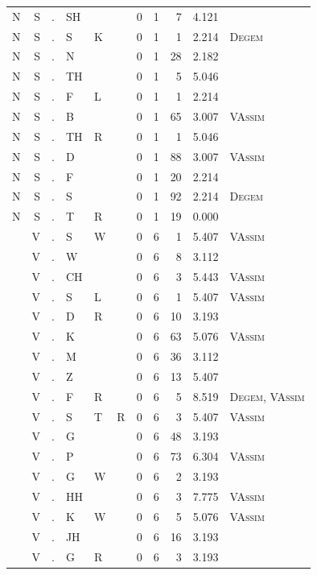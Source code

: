 \documentclass[12pt]{article}
\begin{document}
\begin{longtable}{r@{ } r@{ } c@{ } l@{ } l@{ } l@{ } r r r r l }
N & S & . & SH &  &  & 0 & 1 & 7 & 4.121 &  \\
N & S & . & S & K &  & 0 & 1 & 1 & 2.214 & \textsc{Degem} \\
N & S & . & N &  &  & 0 & 1 & 28 & 2.182 &  \\
N & S & . & TH &  &  & 0 & 1 & 5 & 5.046 &  \\
N & S & . & F & L &  & 0 & 1 & 1 & 2.214 &  \\
N & S & . & B &  &  & 0 & 1 & 65 & 3.007 & \textsc{VAssim} \\
N & S & . & TH & R &  & 0 & 1 & 1 & 5.046 &  \\
N & S & . & D &  &  & 0 & 1 & 88 & 3.007 & \textsc{VAssim} \\
N & S & . & F &  &  & 0 & 1 & 20 & 2.214 &  \\
N & S & . & S &  &  & 0 & 1 & 92 & 2.214 & \textsc{Degem} \\
N & S & . & T & R &  & 0 & 1 & 19 & 0.000 &  \\
 & V & . & S & W &  & 0 & 6 & 1 & 5.407 & \textsc{VAssim} \\
 & V & . & W &  &  & 0 & 6 & 8 & 3.112 &  \\
 & V & . & CH &  &  & 0 & 6 & 3 & 5.443 & \textsc{VAssim} \\
 & V & . & S & L &  & 0 & 6 & 1 & 5.407 & \textsc{VAssim} \\
 & V & . & D & R &  & 0 & 6 & 10 & 3.193 &  \\
 & V & . & K &  &  & 0 & 6 & 63 & 5.076 & \textsc{VAssim} \\
 & V & . & M &  &  & 0 & 6 & 36 & 3.112 &  \\
 & V & . & Z &  &  & 0 & 6 & 13 & 5.407 &  \\
 & V & . & F & R &  & 0 & 6 & 5 & 8.519 & \textsc{Degem}, \textsc{VAssim} \\
 & V & . & S & T & R & 0 & 6 & 3 & 5.407 & \textsc{VAssim} \\
 & V & . & G &  &  & 0 & 6 & 48 & 3.193 &  \\
 & V & . & P &  &  & 0 & 6 & 73 & 6.304 & \textsc{VAssim} \\
 & V & . & G & W &  & 0 & 6 & 2 & 3.193 &  \\
 & V & . & HH &  &  & 0 & 6 & 3 & 7.775 & \textsc{VAssim} \\
 & V & . & K & W &  & 0 & 6 & 5 & 5.076 & \textsc{VAssim} \\
 & V & . & JH &  &  & 0 & 6 & 16 & 3.193 &  \\
 & V & . & G & R &  & 0 & 6 & 3 & 3.193 &  \\

\end{longtable}
\end{document}
